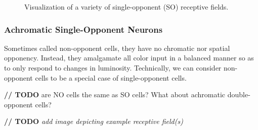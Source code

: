 \documentclass[journal,onecolumn]{IEEEtran}
\begin{document}
\begin{figure}[H]
    \caption{Visualization of a variety of single-opponent (SO) receptive fields.}
    \label{fig:rf-so}
\end{figure}

\subsubsection*{Achromatic Single-Opponent Neurons}

Sometimes called non-opponent cells, they have no chromatic nor spatial opponency. Instead, they amalgamate all color input in a balanced manner so as to only respond to changes in luminosity. Technically, we can consider non-opponent cells to be a special case of single-opponent cells.

\textbf{// TODO} are NO cells the same as SO cells? What about achromatic double-opponent cells?

\textbf{// TODO} \textit{add image depicting example receptive field(s)}
\end{document}
